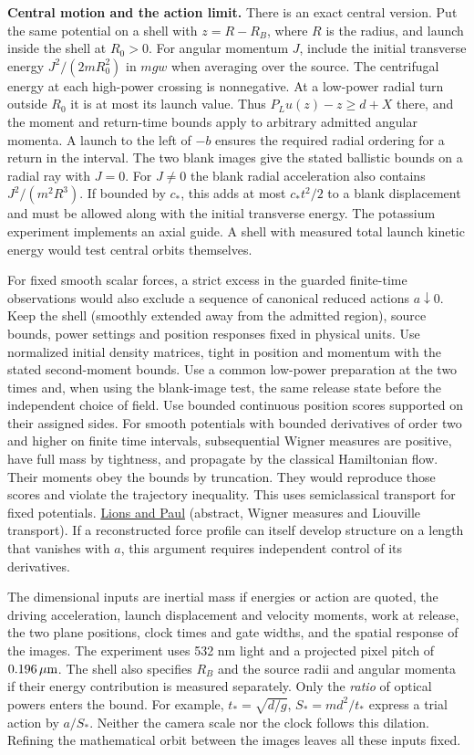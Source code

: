 \documentclass[11pt,a4paper]{article}
\begin{document}
\textbf{Central motion and the action limit.} There is an exact central
version. Put the same potential on a shell with \(z=R-R_B\), where \(R\)
is the radius, and launch inside the shell at \(R_0>0\). For angular
momentum \(J\), include the initial transverse energy \(J^2/(2mR_0^2)\)
in \(mgw\) when averaging over the source. The centrifugal energy at
each high-power crossing is nonnegative. At a low-power radial turn
outside \(R_0\) it is at most its launch value. Thus
\(P_Lu(z)-z\ge d+X\) there, and the moment and return-time bounds apply
to arbitrary admitted angular momenta. A launch to the left of \(-b\)
ensures the required radial ordering for a return in the interval. The
two blank images give the stated ballistic bounds on a radial ray with
\(J=0\). For \(J\ne0\) the blank radial acceleration also contains
\(J^2/(m^2R^3)\). If bounded by \(c_*\), this adds at most \(c_*t^2/2\)
to a blank displacement and must be allowed along with the initial
transverse energy. The potassium experiment implements an axial guide. A
shell with measured total launch kinetic energy would test central
orbits themselves.

For fixed smooth scalar forces, a strict excess in the guarded
finite-time observations would also exclude a sequence of canonical
reduced actions \(a\downarrow0\). Keep the shell (smoothly extended away
from the admitted region), source bounds, power settings and position
responses fixed in physical units. Use normalized initial density
matrices, tight in position and momentum with the stated second-moment
bounds. Use a common low-power preparation at the two times and, when
using the blank-image test, the same release state before the
independent choice of field. Use bounded continuous position scores
supported on their assigned sides. For smooth potentials with bounded
derivatives of order two and higher on finite time intervals,
subsequential Wigner measures are positive, have full mass by tightness,
and propagate by the classical Hamiltonian flow. Their moments obey the
bounds by truncation. They would reproduce those scores and violate the
trajectory inequality. This uses semiclassical transport for fixed
potentials. \href{https://doi.org/10.4171/RMI/143}{Lions and Paul}
(abstract, Wigner measures and Liouville transport). If a reconstructed
force profile can itself develop structure on a length that vanishes
with \(a\), this argument requires independent control of its
derivatives.

The dimensional inputs are inertial mass if energies or action are
quoted, the driving acceleration, launch displacement and velocity
moments, work at release, the two plane positions, clock times and gate
widths, and the spatial response of the images. The experiment uses 532
nm light and a projected pixel pitch of \(0.196\,\mu{\rm m}\). The shell
also specifies \(R_B\) and the source radii and angular momenta if their
energy contribution is measured separately. Only the \emph{ratio} of
optical powers enters the bound. For example, \(t_*=\sqrt{d/g}\),
\(S_*=md^2/t_*\) express a trial action by \(a/S_*\). Neither the camera
scale nor the clock follows this dilation. Refining the mathematical
orbit between the images leaves all these inputs fixed.
\end{document}
